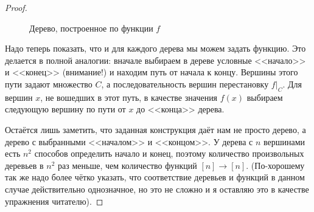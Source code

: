 \begin{proof}
\begin{figure}[h]
\caption{Дерево, построенное по функции $f$}
\end{figure}

Надо теперь показать, что и для каждого дерева мы можем задать функцию. Это делается в полной аналогии: вначале выбираем в дереве условные <<начало>> и <<конец>> (внимание!) и находим путь от начала к концу. Вершины этого пути задают множество $C$, а последовательность вершин перестановку $f|_C$. Для вершин $x$, не вошедших в этот путь, в качестве значения $f(x)$ выбираем следующую вершину по пути от $x$ до <<конца>> дерева.

Остаётся лишь заметить, что заданная конструкция даёт нам не просто дерево, а дерево с выбранными <<началом>> и <<концом>>. У дерева с $n$ вершинами есть $n^2$ способов определить начало и конец, поэтому количество произвольных деревьев в $n^2$ раз меньше, чем количество функций $[n]\to[n]$. (По-хорошему так же надо более чётко указать, что соответствие деревьев и функций в данном случае действительно однозначное, но это не сложно и я оставляю это в качестве упражнения читателю).
\end{proof}
